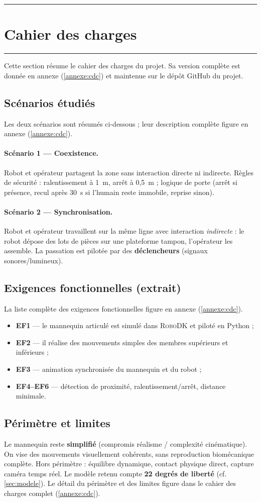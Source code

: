 \documentclass[12pt]{article}
\newcommand{\barre}{\noindent\textcolor{supmerange}{\rule{\textwidth}{3pt}}}
\newcommand{\rsection}[1]{%
  \barre\par\vspace{2pt}%
  \section{#1}%
  \vspace{-6pt}\barre\par\vspace{0.7em}}
\begin{document}
\rsection{Cahier des charges}

Cette section résume le cahier des charges du projet. Sa version complète est
donnée en annexe (\cref{annexe:cdc}) et maintenue sur le dépôt GitHub du projet.

\subsection{Scénarios étudiés}
Les deux scénarios sont résumés ci-dessous ; leur description complète figure en
annexe (\cref{annexe:cdc}).

\paragraph{Scénario 1 --- Coexistence.} Robot et opérateur partagent la zone sans
interaction directe ni indirecte. Règles de sécurité : ralentissement à 1~m,
arrêt à 0{,}5~m ; logique de porte (arrêt si présence, recul après 30~s si
l'humain reste immobile, reprise sinon).

\paragraph{Scénario 2 --- Synchronisation.} Robot et opérateur travaillent sur la
même ligne avec interaction \emph{indirecte} : le robot dépose des lots de pièces
sur une plateforme tampon, l'opérateur les assemble. La passation est pilotée par
des \textbf{déclencheurs} (signaux sonores/lumineux).

\subsection{Exigences fonctionnelles (extrait)}
La liste complète des exigences fonctionnelles figure en annexe
(\cref{annexe:cdc}).
\begin{itemize}[noitemsep]
  \item \textbf{EF1} --- le mannequin articulé est simulé dans \textsc{RoboDK} et piloté en Python ;
  \item \textbf{EF2} --- il réalise des mouvements simples des membres supérieurs et inférieurs ;
  \item \textbf{EF3} --- animation synchronisée du mannequin et du robot ;
  \item \textbf{EF4--EF6} --- détection de proximité, ralentissement/arrêt, distance minimale.
\end{itemize}

\subsection{Périmètre et limites}
Le mannequin reste \textbf{simplifié} (compromis réalisme / complexité
cinématique). On vise des mouvements visuellement cohérents, sans reproduction
biomécanique complète. Hors périmètre : équilibre dynamique, contact physique
direct, capture caméra temps réel. Le modèle retenu compte \textbf{22 degrés de
liberté} (cf. \cref{sec:modele}). Le détail du périmètre et des limites figure
dans le cahier des charges complet (\cref{annexe:cdc}).
\end{document}
